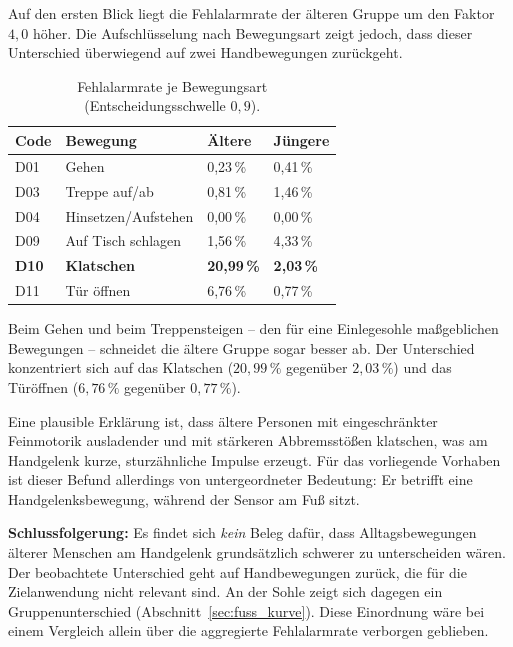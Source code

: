 \documentclass[11pt,a4paper,oneside]{report}
\begin{document}
Auf den ersten Blick liegt die Fehlalarmrate der älteren Gruppe um
den Faktor $4{,}0$ höher. Die Aufschlüsselung nach Bewegungsart
zeigt jedoch, dass dieser Unterschied überwiegend auf zwei
Handbewegungen zurückgeht.

\begin{table}[H]
\centering
\caption{Fehlalarmrate je Bewegungsart (Entscheidungsschwelle
         $0{,}9$).}
\label{tab:zielgruppe_bewegung}
\small
\begin{tabularx}{0.85\textwidth}{l X C{2.1cm} C{2.1cm}}
\toprule
\textbf{Code} & \textbf{Bewegung} & \textbf{Ältere} & \textbf{Jüngere} \\
\midrule
D01 & Gehen                & 0,23\,\% & 0,41\,\% \\
D03 & Treppe auf/ab        & 0,81\,\% & 1,46\,\% \\
D04 & Hinsetzen/Aufstehen  & 0,00\,\% & 0,00\,\% \\
D09 & Auf Tisch schlagen   & 1,56\,\% & 4,33\,\% \\
\textbf{D10} & \textbf{Klatschen} & \textbf{20,99\,\%} & \textbf{2,03\,\%} \\
D11 & Tür öffnen           & 6,76\,\% & 0,77\,\% \\
\bottomrule
\end{tabularx}
\end{table}

Beim Gehen und beim Treppensteigen -- den für eine Einlegesohle
maßgeblichen Bewegungen -- schneidet die ältere Gruppe sogar besser
ab. Der Unterschied konzentriert sich auf das Klatschen
($20{,}99\,\%$ gegenüber $2{,}03\,\%$) und das Türöffnen ($6{,}76\,\%$
gegenüber $0{,}77\,\%$).

Eine plausible Erklärung ist, dass ältere Personen mit
eingeschränkter Feinmotorik ausladender und mit stärkeren
Abbremsstößen klatschen, was am Handgelenk kurze, sturzähnliche
Impulse erzeugt. Für das vorliegende Vorhaben ist dieser Befund
allerdings von untergeordneter Bedeutung: Er betrifft eine
Handgelenksbewegung, während der Sensor am Fuß sitzt.

\textbf{Schlussfolgerung:} Es findet sich \emph{kein} Beleg dafür,
dass Alltagsbewegungen älterer Menschen am Handgelenk grundsätzlich
schwerer zu unterscheiden wären. Der beobachtete Unterschied geht auf
Handbewegungen zurück, die für die Zielanwendung nicht relevant sind.
An der Sohle zeigt sich dagegen ein Gruppenunterschied
(Abschnitt~\ref{sec:fuss_kurve}). Diese Einordnung wäre bei einem Vergleich
allein über die aggregierte Fehlalarmrate verborgen geblieben.
\end{document}
